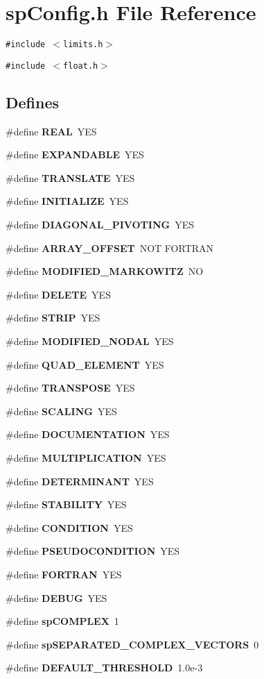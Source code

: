 \section{sp\-Config.h File Reference}
\label{spConfig_8h}
{\tt \#include $<$limits.h$>$}\par
{\tt \#include $<$float.h$>$}\par
\subsection*{Defines}
\begin{CompactItemize}
\item 
\#define {\bf REAL}\ YES
\item 
\#define {\bf EXPANDABLE}\ YES
\item 
\#define {\bf TRANSLATE}\ YES
\item 
\#define {\bf INITIALIZE}\ YES
\item 
\#define {\bf DIAGONAL\_\-PIVOTING}\ YES
\item 
\#define {\bf ARRAY\_\-OFFSET}\ NOT FORTRAN
\item 
\#define {\bf MODIFIED\_\-MARKOWITZ}\ NO
\item 
\#define {\bf DELETE}\ YES
\item 
\#define {\bf STRIP}\ YES
\item 
\#define {\bf MODIFIED\_\-NODAL}\ YES
\item 
\#define {\bf QUAD\_\-ELEMENT}\ YES
\item 
\#define {\bf TRANSPOSE}\ YES
\item 
\#define {\bf SCALING}\ YES
\item 
\#define {\bf DOCUMENTATION}\ YES
\item 
\#define {\bf MULTIPLICATION}\ YES
\item 
\#define {\bf DETERMINANT}\ YES
\item 
\#define {\bf STABILITY}\ YES
\item 
\#define {\bf CONDITION}\ YES
\item 
\#define {\bf PSEUDOCONDITION}\ YES
\item 
\#define {\bf FORTRAN}\ YES
\item 
\#define {\bf DEBUG}\ YES
\item 
\#define {\bf sp\-COMPLEX}\ 1
\item 
\#define {\bf sp\-SEPARATED\_\-COMPLEX\_\-VECTORS}\ 0
\item 
\#define {\bf DEFAULT\_\-THRESHOLD}\ 1.0e-3
\item 

\end{CompactItemize}
